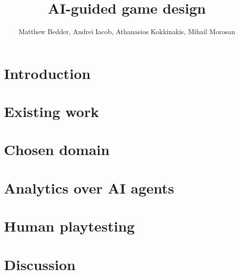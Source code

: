 \documentclass[9pt]{IEEEtran}
\title{AI-guided game design}
\author{Matthew Bedder, Andrei Iacob, Athanasios Kokkinakis, Mihail Morosan}
\begin{document}
\maketitle
\section{Introduction}

\section{Existing work}

\section{Chosen domain}

\section{Analytics over AI agents}

\section{Human playtesting}

\section{Discussion}




\end{document}
